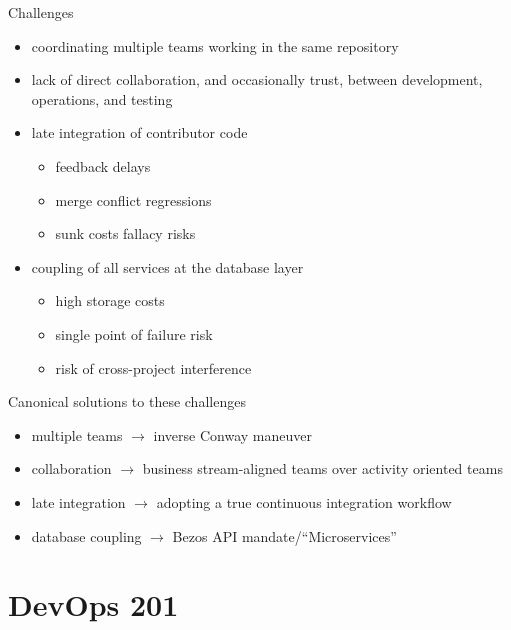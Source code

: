 \documentclass{beamer}
\begin{document}
	\begin{frame}{Challenges}
		\begin{itemize}
			\item coordinating multiple teams working in the same repository \pause
			\item lack of direct collaboration, and occasionally trust, between development, operations, and testing \pause
			\item late integration of contributor code \pause
			\begin{itemize}
				\item feedback delays \pause
				\item merge conflict regressions \pause
				\item sunk costs fallacy risks \pause
			\end{itemize}
			\item coupling of all services at the database layer \pause
			\begin{itemize}
				\item high storage costs \pause
				\item single point of failure risk \pause
				\item risk of cross-project interference \pause
			\end{itemize}
		\end{itemize}
	\end{frame}
	\begin{frame}{Canonical solutions to these challenges}
		\begin{itemize}
			\item multiple teams $\rightarrow$ inverse Conway maneuver \pause
			\item collaboration $\rightarrow$ business stream-aligned teams over activity oriented teams \pause
			\item late integration $\rightarrow$ adopting a true continuous integration workflow \pause
			\item database coupling $\rightarrow$ Bezos API mandate/``Microservices'' \pause
			
			
		\end{itemize}
	\end{frame}
	
	\section{DevOps 201}
\end{document}
